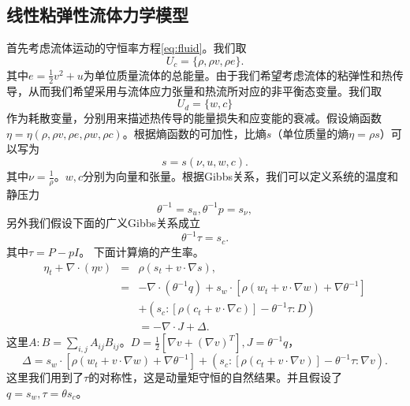 	\subsection{线性粘弹性流体力学模型}
	首先考虑流体运动的守恒率方程\eqref{eq:fluid}。我们取
	\begin{equation*}
		U_c = \{\rho, \rho v, \rho e\}.
	\end{equation*}
	其中$e = \frac{1}{2} v^2 + u$为单位质量流体的总能量。由于我们希望考虑流体的粘弹性和热传导，从而我们希望采用与流体应力张量和热流所对应的非平衡态变量。我们取
	\begin{equation*}
		U_d = \{ w, c\}
	\end{equation*}
	作为耗散变量，分别用来描述热传导的能量损失和应变能的衰减。假设熵函数$\eta = \eta (\rho,\rho v ,\rho e, \rho w, \rho c)$。根据熵函数的可加性，比熵$s$（单位质量的熵$\eta = \rho s$）可以写为
	\begin{equation*}
		s = s(\nu, u, w, c).
	\end{equation*}
	其中$\nu = \frac{1}{\rho}$。$w,c$分别为向量和张量。根据Gibbs关系，我们可以定义系统的温度和静压力
	\begin{equation*}
		\theta^{-1} = s_u,\theta^{-1} p = s_{\nu},
	\end{equation*}
	另外我们假设下面的广义Gibbs关系成立
	\begin{equation*}
		\theta^{-1} \tau = s_c.
	\end{equation*}
	其中$\tau = P - pI$。%
    下面计算熵的产生率。
	\begin{eqnarray*}
		\eta_t + \nabla \cdot (\eta v) &=& \rho (s_t + v \cdot \nabla s), \\
		&=& -\nabla \cdot (\theta^{-1} q) + s_w \cdot [\rho (w_t + v \cdot \nabla w) + \nabla \theta^{-1}] \\
		&&+ (s_c:[\rho (c_t + v \cdot \nabla c)] - \theta^{-1} \tau : D) \\
		&& = -\nabla \cdot J + \Delta.
	\end{eqnarray*}
	这里$A:B = \sum_{i,j}A_{ij}B_{ij}$。$D = \frac{1}{2} [\nabla v + (\nabla v)^T], J =\theta^{-1} q $，
	\begin{equation*}
		\Delta = s_w \cdot [\rho (w_t + v \cdot \nabla w) + \nabla \theta^{-1}] + (s_c:[\rho (c_t + v \cdot \nabla v)] - \theta^{-1} \tau : \nabla v) .
	\end{equation*}
	这里我们用到了$\tau$的对称性，这是动量矩守恒的自然结果\cite{dimitrienko2010nonlinear}。并且假设了$q =s_w,\tau = \theta s_c$。

